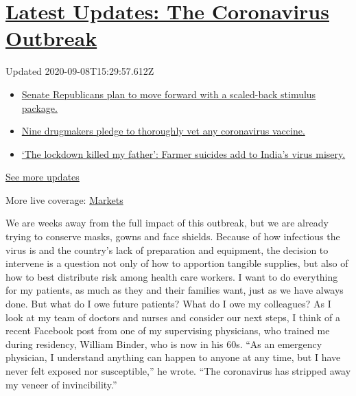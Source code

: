 \hypertarget{latest-updates-the-coronavirus-outbreak}{%
\section{\texorpdfstring{\href{https://www.nytimes3xbfgragh.onion/2020/09/08/world/covid-19-coronavirus.html?action=click\&pgtype=Article\&state=default\&region=MAIN_CONTENT_1\&context=storylines_live_updates}{Latest
Updates: The Coronavirus
Outbreak}}{Latest Updates: The Coronavirus Outbreak}}\label{latest-updates-the-coronavirus-outbreak}}

Updated 2020-09-08T15:29:57.612Z

\begin{itemize}
\tightlist
\item
  \href{https://www.nytimes3xbfgragh.onion/2020/09/08/world/covid-19-coronavirus.html?action=click\&pgtype=Article\&state=default\&region=MAIN_CONTENT_1\&context=storylines_live_updates\#link-547feae1}{Senate
  Republicans plan to move forward with a scaled-back stimulus package.}
\item
  \href{https://www.nytimes3xbfgragh.onion/2020/09/08/world/covid-19-coronavirus.html?action=click\&pgtype=Article\&state=default\&region=MAIN_CONTENT_1\&context=storylines_live_updates\#link-679303d7}{Nine
  drugmakers pledge to thoroughly vet any coronavirus vaccine.}
\item
  \href{https://www.nytimes3xbfgragh.onion/2020/09/08/world/covid-19-coronavirus.html?action=click\&pgtype=Article\&state=default\&region=MAIN_CONTENT_1\&context=storylines_live_updates\#link-1c973131}{`The
  lockdown killed my father': Farmer suicides add to India's virus
  misery.}
\end{itemize}

\href{https://www.nytimes3xbfgragh.onion/2020/09/08/world/covid-19-coronavirus.html?action=click\&pgtype=Article\&state=default\&region=MAIN_CONTENT_1\&context=storylines_live_updates}{See
more updates}

More live coverage:
\href{https://www.nytimes3xbfgragh.onion/live/2020/09/08/business/stock-market-today-coronavirus?action=click\&pgtype=Article\&state=default\&region=MAIN_CONTENT_1\&context=storylines_live_updates}{Markets}

We are weeks away from the full impact of this outbreak, but we are
already trying to conserve masks, gowns and face shields. Because of how
infectious the virus is and the country's lack of preparation and
equipment, the decision to intervene is a question not only of how to
apportion tangible supplies, but also of how to best distribute risk
among health care workers. I want to do everything for my patients, as
much as they and their families want, just as we have always done. But
what do I owe future patients? What do I owe my colleagues? As I look at
my team of doctors and nurses and consider our next steps, I think of a
recent Facebook post from one of my supervising physicians, who trained
me during residency, William Binder, who is now in his 60s. ``As an
emergency physician, I understand anything can happen to anyone at any
time, but I have never felt exposed nor susceptible,'' he wrote. ``The
coronavirus has stripped away my veneer of invincibility.''

